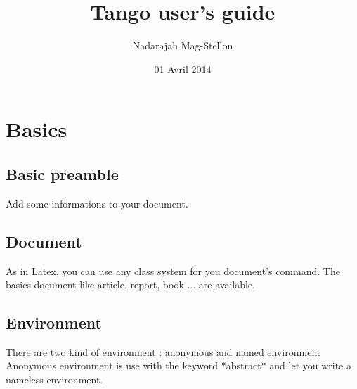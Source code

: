 \section{Basics}

\subsection{Basic preamble}
Add some informations to your document.
\begin{code}[langague=tango]
  \title{Tango user's guide}
  \author{Nadarajah Mag-Stellon}
  \date{01 Avril 2014}
\end{code}

\subsection{Document}
As in Latex, you can use any class system for you document's command.
The basics document like article, report, book ... are available.
\begin{code}[langague=tango]
\end{code}

\subsection{Environment}
There are two kind of environment : anonymous and named environment
Anonymous environment is use with the keyword *abstract* and let you write a nameless environment.
\begin{code}[langague=tango]
  \begin{EnvironementA}
  \end{EnvironmentA}

  \begin{abstract}
  \end{abstract}
\end{code}

